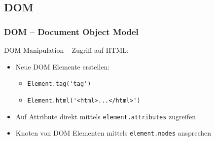 \documentclass{beamer}
\begin{document}
\subsection{DOM}
\begin{frame}[fragile]
\frametitle{DOM -- Document Object Model}
DOM Manipulation -- Zugriff auf HTML:
\begin{itemize}
\item Neue DOM Elemente erstellen:
\begin{itemize}
\item \lstinline|Element.tag('tag')|
\item \lstinline|Element.html('<html>...</html>')|
\end{itemize}
\pause
\item Auf Attribute direkt mittels \lstinline|element.attributes| zugreifen
\pause
\item Knoten von DOM Elementen mittels \lstinline|element.nodes| ansprechen
\end{itemize}
\end{frame}

%
\end{document}
